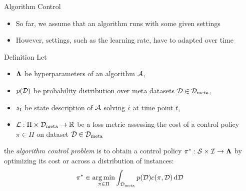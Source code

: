 \begin{frame}[c]{Algorithm Control}

\begin{itemize}
	\item So far, we assume that an algorithm runs with some given settings
	\item However, settings, such as the learning rate, have to adapted over time
\end{itemize}

\begin{block}{Definition}
	Let 
	\begin{itemize}
		\item $\mathbf{\Lambda}$ be hyperparameters of an algorithm $\mathcal{A}$,
		\pause
		\item $p(\mathcal{D})$ be probability distribution over meta datasets $\mathcal{D} \in \mathcal{D}_{\text{meta}}$,
		\pause
		\item $s_t$ be state description of $\mathcal{A}$ solving $i$ at time point $t$,
		\pause
		\item $\mathcal{L}: \Pi \times \mathcal{D}_{\text{meta}} \to \mathbb{R}$ be a loss metric assessing the cost of a control policy $\pi \in \Pi$ on dataset $\mathcal{D} \in \mathcal{D}_{\text{meta}}$
	\end{itemize}
	
	the \emph{algorithm control problem} is to obtain a control policy $\pi^* : \mathcal{S} \times \mathcal{I} \to \mathbf{\Lambda}$ by optimizing its cost 
	or across a distribution of instances:
	\begin{equation}
	\pi^* \in \operatorname*{arg\,min}_{\pi \in \Pi} \int_{\mathcal{D}_{\text{meta}}} p(\mathcal{D}) c(\pi, \mathcal{D}) \mathop{}\!\mathrm{d} \mathcal{D} \nonumber
	\end{equation}
\end{block}

\end{frame}


